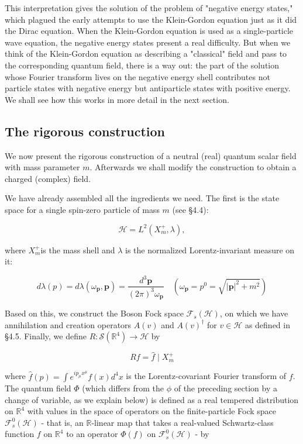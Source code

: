 \documentclass[10pt, letterpaper]{article}
\begin{document}
This interpretation gives the solution of the problem of "negative energy states," which plagued the early attempts to use the Klein-Gordon equation just as it did the Dirac equation. When the Klein-Gordon equation is used as a single-particle wave equation, the negative energy states present a real difficulty. But when we think of the Klein-Gordon equation as describing a "classical" field and pass to the corresponding quantum field, there is a way out: the part of the solution whose Fourier transform lives on the negative energy shell contributes not particle states with negative energy but antiparticle states with positive energy. We shall see how this works in more detail in the next section.


\pagebreak

\subsection*{The rigorous construction}
We now present the rigorous construction of a neutral (real) quantum scalar field with mass parameter $m$. Afterwards we shall modify the construction to obtain a charged (complex) field.

We have already assembled all the ingredients we need. The first is the state space for a single spin-zero particle of mass $m$ (see §4.4):

$$
\mathcal{H}=L^{2}\left(X_{m}^{+}, \lambda\right),
$$

where $X_{m}^{+}$is the mass shell and $\lambda$ is the normalized Lorentz-invariant measure on it:

$$
d \lambda(p)=d \lambda\left(\omega_{\mathbf{p}}, \mathbf{p}\right)=\frac{d^{3} \mathbf{p}}{(2 \pi)^{3} \omega_{\mathbf{p}}} \quad\left(\omega_{\mathbf{p}}=p^{0}=\sqrt{|\mathbf{p}|^{2}+m^{2}}\right)
$$

Based on this, we construct the Boson Fock space $\mathcal{F}_{s}(\mathcal{H})$, on which we have annihilation and creation operators $A(v)$ and $A(v)^{\dagger}$ for $v \in \mathcal{H}$ as defined in §4.5. Finally, we define $R: \mathcal{S}\left(\mathbb{R}^{4}\right) \rightarrow \mathcal{H}$ by

$$
R f=\widehat{f} \mid X_{m}^{+}
$$

where $\widehat{f}(p)=\int e^{i p_{\mu} x^{\mu}} f(x) d^{4} x$ is the Lorentz-covariant Fourier transform of $f$.\\
The quantum field $\Phi$ (which differs from the $\phi$ of the preceding section by a change of variable, as we explain below) is defined as a real tempered distribution on $\mathbb{R}^{4}$ with values in the space of operators on the finite-particle Fock space $\mathcal{F}_{s}^{0}(\mathcal{H})$ - that is, an $\mathbb{R}$-linear map that takes a real-valued Schwartz-class function $f$ on $\mathbb{R}^{4}$ to an operator $\Phi(f)$ on $\mathcal{F}_{s}^{0}(\mathcal{H})$ - by
\end{document}
